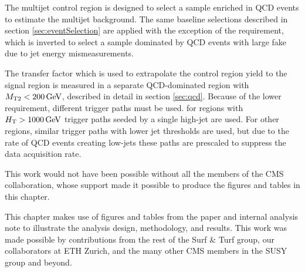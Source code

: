 The multijet control region is designed to select  a sample enriched in QCD events to estimate the multijet background. The same baseline selections described in section \ref{sec:eventSelection} are applied with the exception of the \dphilong requirement, which is inverted to select a sample dominated by QCD events with large fake \MET due to jet energy mismeasurements.

The transfer factor which is used to extrapolate the control region yield to the signal region is measured in a separate QCD-dominated region with $M_{\mathrm{T2}} < 200\,\text{Ge\hspace{-.08em}V}$, described in detail in section \ref{sec:qcd}. Because of the lower \MET requirement, different trigger paths must be used. for regions with $H_{\mathrm{T}} > 1000\,\text{Ge\hspace{-.08em}V}$ trigger paths seeded by a single high-\pt jet are used. For other \HT regions, similar trigger paths with lower jet \pt thresholds are used, but due to the rate of QCD events creating low-\pt jets these paths are prescaled to suppress the data acquisition rate.

This work would not have been possible without all the members of the CMS collaboration, whose support made it possible to produce the figures and tables in this chapter.

This chapter makes use of figures and tables from the \mttwo paper and internal analysis note to illustrate the analysis design, methodology, and results. This work was made possible by contributions from the rest of the Surf \& Turf group, our collaborators at ETH Zurich, and the many other CMS members in the SUSY group and beyond.

